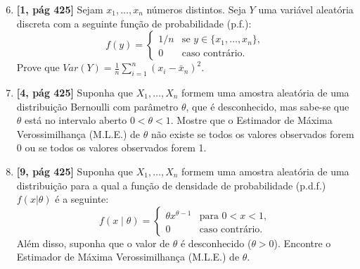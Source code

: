 \documentclass[leqno, 12pt]{article}
\begin{document}
\begin{enumerate}

\setcounter{enumi}{5}


\item \textbf{[1, pág 425]} Sejam \(x_1, \ldots , x_n\) números distintos. Seja \(Y\) uma variável aleatória discreta com a seguinte função de probabilidade (p.f.):
\[ f(y) = \begin{cases}
1/n & \text{se } y \in \{x_1, \ldots , x_n\}, \\
0 & \text{caso contrário}.
\end{cases} \]
Prove que \(Var(Y) = \frac{1}{n} \sum_{i=1}^{n} (x_i - \bar x_n)^2 \).


\item \textbf{[4, pág 425]} Suponha que \( X_1, \ldots , X_n \) formem uma amostra aleatória de uma distribuição Bernoulli com parâmetro \( \theta \), que é desconhecido, mas sabe-se que \( \theta \) está no intervalo aberto \( 0 < \theta < 1 \). Mostre que o Estimador de Máxima Verossimilhança (M.L.E.) de \( \theta \) não existe se todos os valores observados forem 0 ou se todos os valores observados forem 1.


\item \textbf{[9, pág 425]} Suponha que \(X_1, \ldots , X_n\) formem uma amostra aleatória de uma distribuição para a qual a função de densidade de probabilidade (p.d.f.) \(f(x|\theta)\) é a seguinte:
\[ f(x\mid\theta) = \begin{cases}
\theta x^{\theta-1} & \text{para } 0 < x < 1, \\
0 & \text{caso contrário}.
\end{cases} \]
Além disso, suponha que o valor de \( \theta \) é desconhecido (\( \theta > 0 \)). Encontre o Estimador de Máxima Verossimilhança (M.L.E.) de \( \theta \).

\end{enumerate}
\end{document}
